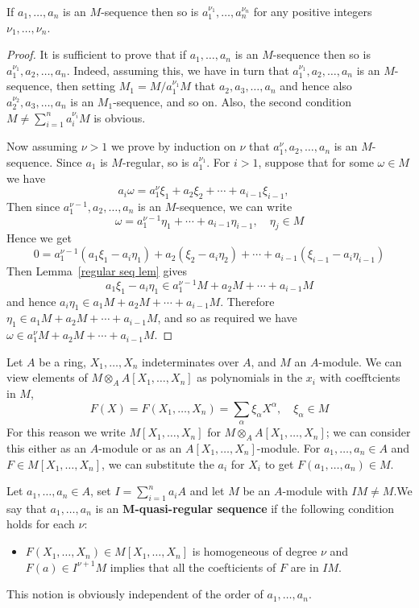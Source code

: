\begin{proposition}\label{regular power}
If $a_1,\dots,a_n$ is an $M$-sequence then so is $a_1^{\nu_1},\dots,a_n^{\nu_n}$ for any positive integers $\nu_1,\dots,\nu_n$.
\end{proposition}
\begin{proof}
It is sufficient to prove that if $a_1,\dots,a_n$ is an $M$-sequence then so is $a_1^{\nu_1},a_2,\dots,a_n$. Indeed, assuming this, we have in turn that $a_1^{\nu_1},a_2,\dots,a_n$ is an $M$-sequence, then setting $M_1=M/a_1^{\nu_1}M$ that $a_2,a_3,\dots,a_n$ and hence also $a_2^{\nu_2},a_3,\dots,a_n$ is an $M_1$-sequence, and so on. Also, the
second condition $M\neq\sum_{i=1}^{n}a_i^{\nu_i}M$ is obvious.\par
Now assuming $\nu>1$ we prove by induction on $\nu$ that $a_1^{\nu},a_2,\dots,a_n$ is an $M$-sequence. Since $a_1$ is $M$-regular, so is $a_1^{\nu_1}$. For $i>1$, suppose that for some $\omega\in M$ we have
\[a_i\omega=a_1^{\nu}\xi_1+a_2\xi_2+\cdots+a_{i-1}\xi_{i-1},\quad\]
Then since $a_1^{\nu-1},a_2,\dots,a_n$ is an $M$-sequence, we can write
\[\omega=a_1^{\nu-1}\eta_1+\cdots+a_{i-1}\eta_{i-1},\quad\eta_j\in M\]
Hence we get 
\[0=a_1^{\nu-1}(a_1\xi_1-a_i\eta_1)+a_2(\xi_2-a_i\eta_2)+\cdots+a_{i-1}(\xi_{i-1}-a_i\eta_{i-1})\]
Then Lemma~\ref{regular seq lem} gives \[a_1\xi_1-a_i\eta_1\in a_1^{\nu-1}M+a_2M+\cdots+a_{i-1}M\]
and hence $a_i\eta_1\in a_1M+a_2M+\cdots+a_{i-1}M$. Therefore $\eta_1\in a_1M+a_2M+\cdots+a_{i-1}M$, and so as required we have $\omega\in a_1^{\nu}M+a_2M+\cdots+a_{i-1}M$.
\end{proof}
Let $A$ be a ring, $X_1,\dots,X_n$ indeterminates over $A$, and $M$ an $A$-module. We can view elements of $M\otimes_AA[X_1,\dots,X_n]$ as polynomials in the $x_i$ with coefftcients in $M$,
\[F(X)=F(X_1,\dots,X_n)=\sum_\alpha\xi_\alpha X^\alpha,\quad \xi_\alpha\in M\]
For this reason we write $M[X_1,\dots,X_n]$ for $M\otimes_AA[X_1,\dots,X_n]$; we can consider this either as an $A$-module or as an $A[X_1,\dots,X_n]$-module. For $a_1,\dots,a_n\in A$ and $F\in M[X_1,\dots,X_n]$, we can substitute the $a_i$ for $X_i$ to get $F(a_1,\dots,a_n)\in M$.
\begin{definition}
Let $a_1,\dots,a_n\in A$, set $I=\sum_{i=1}^{n}a_iA$ and let $M$ be an $A$-module with $IM\neq M$.We say that $a_1,\dots,a_n$ is an \textbf{$\bm{M}$-quasi-regular sequence} if the following condition holds for each $\nu$:
\begin{itemize}
\item $F(X_1,\dots,X_n)\in M[X_1,\dots,X_n]$ is homogeneous of degree $\nu$ and $F(a)\in I^{\nu+1}M$ implies that all the coefticients of $F$ are in $IM$.
\end{itemize}
This notion is obviously independent of the order of $a_1,\dots,a_n$.
\end{definition}

